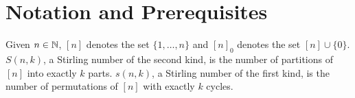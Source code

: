 \section{Notation and Prerequisites}
	
	Given $n \in \mathbb{N}$, $[n]$ denotes the set $\{1,\ldots,n\}$ and $[n]_0$ denotes the set $[n] \cup \{0\}$.\\
	$S(n,k)$, a Stirling number of the second kind, is the number of partitions of $[n]$ into exactly $k$ parts. $s(n,k)$, a Stirling number of the first kind, is the number of permutations of $[n]$ with exactly $k$ cycles.\\
	
\clearpage